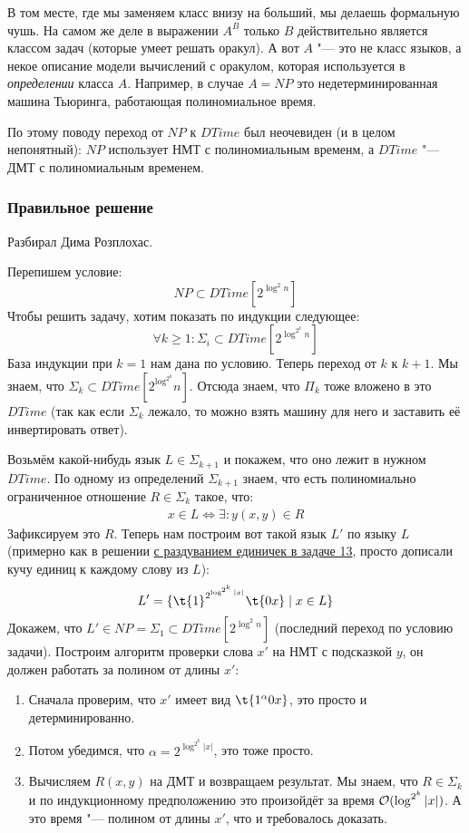 		\begin{Rem}
			В том месте, где мы заменяем класс внизу на больший, мы делаешь формальную чушь.
			На самом же деле в выражении $A^B$ только $B$ действительно является классом задач
			(которые умеет решать оракул).
			А вот $A$ "--- это не класс языков, а некое описание модели вычислений с оракулом,
			которая используется в \textit{определении} класса $A$.
			Например, в случае $A=NP$ это недетерминированная машина Тьюринга, работающая полиномиальное время.

			По этому поводу переход от $NP$ к $DTime$ был неочевиден (и в целом непонятный): $NP$
			использует НМТ с полиномиальным временм, а $DTime$ "--- ДМТ с полиномиальным временем.
		\end{Rem}

	\subsubsection{Правильное решение}
		Разбирал Дима Розплохас.

		Перепишем условие:
		\[ NP \subset DTime[2^{\log^2 n}] \]
		Чтобы решить задачу, хотим показать по индукции следующее:
		\[ \forall k \ge 1 \colon \Sigma_i \subset DTime[2^{\log^{2^k} n}] \]
		База индукции при $k=1$ нам дана по условию.
		Теперь переход от $k$ к $k+1$.
		Мы знаем, что $\Sigma_k \subset DTime[2^{\log^{2^k}} n]$.
		Отсюда знаем, что $\Pi_k$ тоже вложено в это $DTime$
		(так как если $\Sigma_k$ лежало, то можно взять машину для него и заставить её инвертировать ответ).

		Возьмём какой-нибудь язык $L \in \Sigma_{k+1}$ и покажем, что оно лежит в нужном $DTime$.
		По одному из определений $\Sigma_{k+1}$ знаем, что есть полиномиально ограниченное отношение
		$R \in \Sigma_k$ такое, что:
		\begin{gather*}
			x \in L \iff \exists \colon y (x, y) \in R
		\end{gather*}
		Зафиксируем это $R$.
		Теперь нам построим вот такой язык $L'$ по языку $L$ (примерно как в решении
		\hyperref[prob13_sol2]{с раздуванием единичек в задаче 13}, просто дописали кучу единиц к
		каждому слову из $L$):
		\[
			L' = \{
				\t{1}^{2^{\log^{2^k} |x|}}
				\t{0x}
				\mid
				x \in L
			\}
		\]
		Докажем, что $L' \in NP = \Sigma_1 \subset DTime[2^{\log^2 n}]$ (последний переход по условию задачи).
		Построим алгоритм проверки слова $x'$ на НМТ с подсказкой $y$, он должен работать за полином
		от длины $x'$:
		\begin{enumerate}
			\item Сначала проверим, что $x'$ имеет вид $\t{1^\alpha 0 x}$, это просто и детерминированно.
			\item Потом убедимся, что $\alpha = 2^{\log^{2^k} |x|}$, это тоже просто.
			\item
				Вычисляем $R(x, y)$ на ДМТ и возвращаем результат.
				Мы знаем, что $R \in \Sigma_k$ и по индукционному предположению это произойдёт за время $\mathcal O(\log^{2^k} |x|)$.
				А это время "--- полином от длины $x'$, что и требовалось доказать.
		\end{enumerate}

